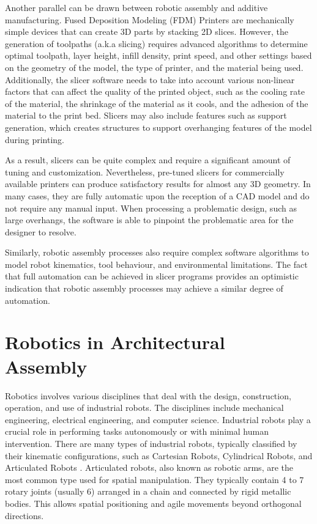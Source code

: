 Another parallel can be drawn between robotic assembly and additive manufacturing. Fused Deposition Modeling (FDM) Printers are mechanically simple devices that can create 3D parts by stacking 2D slices. However, the generation of toolpaths (a.k.a slicing) requires advanced algorithms to determine optimal toolpath, layer height, infill density, print speed, and other settings based on the geometry of the model, the type of printer, and the material being used. Additionally, the slicer software needs to take into account various non-linear factors that can affect the quality of the printed object, such as the cooling rate of the material, the shrinkage of the material as it cools, and the adhesion of the material to the print bed. Slicers may also include features such as support generation, which creates structures to support overhanging features of the model during printing. 

As a result, slicers can be quite complex and require a significant amount of tuning and customization. Nevertheless, pre-tuned slicers for commercially available printers can produce satisfactory results for almost any 3D geometry. In many cases, they are fully automatic upon the reception of a CAD model and do not require any manual input. When processing a problematic design, such as large overhangs, the software is able to pinpoint the problematic area for the designer to resolve. 

Similarly, robotic assembly processes also require complex software algorithms to model robot kinematics, tool behaviour, and environmental limitations. The fact that full automation can be achieved in slicer programs provides an optimistic indication that robotic assembly processes may achieve a similar degree of automation.

\section{Robotics in Architectural Assembly}
\label{section:introduction-robotics-in-architectural-assembly}

Robotics involves various disciplines that deal with the design, construction, operation, and use of industrial robots. The disciplines include mechanical engineering, electrical engineering, and computer science. Industrial robots play a crucial role in performing tasks autonomously or with minimal human intervention. There are many types of industrial robots, typically classified by their kinematic configurations, such as Cartesian Robots, Cylindrical Robots, and Articulated Robots \parencite{waldronKinematics2016}. Articulated robots, also known as robotic arms, are the most common type used for spatial manipulation. They typically contain 4 to 7 rotary joints (usually 6) arranged in a chain and connected by rigid metallic bodies. This allows spatial positioning and agile movements beyond orthogonal directions.

